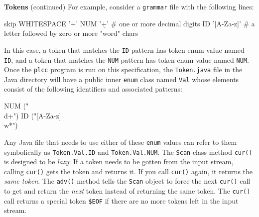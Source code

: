 \begin{minipage}[t]{\sw}
\slidenumber
\LARGE
{\bf Tokens} (continued)\exx
For example, consider a \verb'grammar' file with the following lines:
{\Large%
\begin{qv}
skip WHITESPACE '\s+'
NUM '\d+'        # one or more decimal digits
ID '[A-Za-z]\w*' # a letter followed by zero or more "word" chars
\end{qv}
}
In this case, a token that matches the \verb'ID' pattern
has token enum value named \verb'ID',
and a token that matches the \verb'NUM' pattern
has token enum value named \verb'NUM'.
Once the \verb'plcc' program is run on this specification,
the \verb'Token.java' file in the Java directory
will have a public inner \verb'enum' class named \verb'Val'
whose elements consist of the following identifiers
and associated patterns:
{\Large%
\begin{qv}
NUM ("\\d+")
ID ("[A-Za-z]\\w*")
\end{qv}
}
Any Java file that needs to use either of these \verb'enum' values can refer
to them symbolically as \verb'Token.Val.ID' and \verb'Token.Val.NUM'.\exx
The \verb'Scan' class method \verb'cur()' is designed to be {\em lazy}:
If a token needs to be gotten from the input stream,
calling \verb'cur()' gets the token and returns it.
If you call \verb'cur()' again, it returns the {\em same token}.
The \verb'adv()' method tells the \verb'Scan' object
to force the next \verb'cur()' call
to get and return the {\em next} token instead of returning the same token.
The \verb'cur()' call returns a special token \verb'$EOF'
if there are no more tokens left in the input stream.
\end{minipage}
